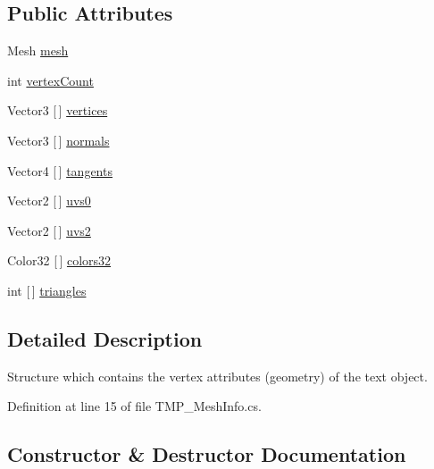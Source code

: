 \subsection*{Public Attributes}
\begin{DoxyCompactItemize}
\item 
Mesh \mbox{\hyperlink{struct_t_m_pro_1_1_t_m_p___mesh_info_a2b53d43187ab86ccefe3f5dd6babcfef}{mesh}}
\item 
int \mbox{\hyperlink{struct_t_m_pro_1_1_t_m_p___mesh_info_a6546f16eff9f1de656a8f75415934aea}{vertex\+Count}}
\item 
Vector3 \mbox{[}$\,$\mbox{]} \mbox{\hyperlink{struct_t_m_pro_1_1_t_m_p___mesh_info_a7f31f8c5b18a9d84129a7f2cb5981728}{vertices}}
\item 
Vector3 \mbox{[}$\,$\mbox{]} \mbox{\hyperlink{struct_t_m_pro_1_1_t_m_p___mesh_info_aefcdce93dcac35b872ddfff6200fa856}{normals}}
\item 
Vector4 \mbox{[}$\,$\mbox{]} \mbox{\hyperlink{struct_t_m_pro_1_1_t_m_p___mesh_info_a15f45cfb1e38b9576d92f6025a767c40}{tangents}}
\item 
Vector2 \mbox{[}$\,$\mbox{]} \mbox{\hyperlink{struct_t_m_pro_1_1_t_m_p___mesh_info_aa6816d4ade18d6066c2c0b17d1fe5987}{uvs0}}
\item 
Vector2 \mbox{[}$\,$\mbox{]} \mbox{\hyperlink{struct_t_m_pro_1_1_t_m_p___mesh_info_a2ea56e0aace99edfe971760bd76a890d}{uvs2}}
\item 
Color32 \mbox{[}$\,$\mbox{]} \mbox{\hyperlink{struct_t_m_pro_1_1_t_m_p___mesh_info_afcf1ebf60c4633e1b14cb1855347d836}{colors32}}
\item 
int \mbox{[}$\,$\mbox{]} \mbox{\hyperlink{struct_t_m_pro_1_1_t_m_p___mesh_info_a377745ba8f3d9d45b012198fad04ae3b}{triangles}}
\end{DoxyCompactItemize}


\subsection{Detailed Description}
Structure which contains the vertex attributes (geometry) of the text object. 



Definition at line 15 of file T\+M\+P\+\_\+\+Mesh\+Info.\+cs.



\subsection{Constructor \& Destructor Documentation}
\mbox{\label{struct_t_m_pro_1_1_t_m_p___mesh_info_a457cf31e803ba04bcbc37a88fe70ab12}} 
